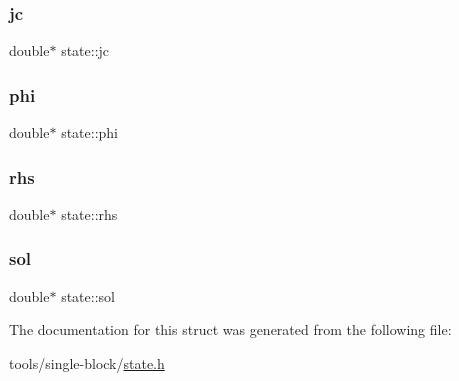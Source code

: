 \mbox{\label{structstate_a4d5cdf77138b2c40a0bf0ada34b56e28}} 
\subsubsection{\texorpdfstring{jc}{jc}}
{\footnotesize\ttfamily double$\ast$ state\+::jc}

\mbox{\label{structstate_a093d6660cfdace12931fbf71916f1219}} 
\subsubsection{\texorpdfstring{phi}{phi}}
{\footnotesize\ttfamily double$\ast$ state\+::phi}

\mbox{\label{structstate_af7c4d54188350e15b8c810650d8e5fde}} 
\subsubsection{\texorpdfstring{rhs}{rhs}}
{\footnotesize\ttfamily double$\ast$ state\+::rhs}

\mbox{\label{structstate_a21f26bbebef43d95673250899d3bcda8}} 
\subsubsection{\texorpdfstring{sol}{sol}}
{\footnotesize\ttfamily double$\ast$ state\+::sol}



The documentation for this struct was generated from the following file\+:\begin{DoxyCompactItemize}
\item 
tools/single-\/block/\mbox{\hyperlink{state_8h}{state.\+h}}\end{DoxyCompactItemize}
